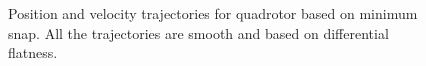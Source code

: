 \documentclass[conference,onecolumn,10pt]{IEEEtran}
\begin{document}
\begin{figure}[htpb]
\centering
{}
\hfil
{}
\caption{Position and velocity trajectories for quadrotor based on minimum snap. All the trajectories are smooth and based on differential flatness.}
\label{fig_sim}
\end{figure} 
\end{document}

